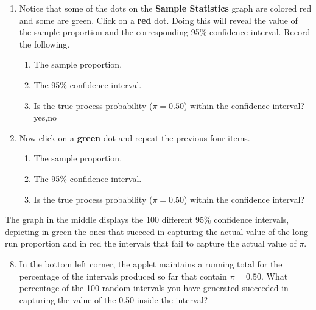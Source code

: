 \documentclass{amsart}
\begin{document}
\begin{Form}
\begin{enumerate}
\item Notice that some of the dots on the \textbf{Sample Statistics} graph are colored red and some are green. Click on a {\bf red} dot. Doing this will reveal the value of the sample proportion and the corresponding 95\% confidence interval. Record the following.
\begin{enumerate}
\item The sample proportion.  \TextField[name=q5b,width=30pt]{}
\item The 95\% confidence interval. \TextField[name=q5c,width=75pt]{}
\item Is the true process probability  ($\pi=0.50$) within the confidence interval?
\ChoiceMenu[combo,name=q5e,width=1.5cm,charsize=14pt]{\mbox{}}
{yes,no} \\
\end{enumerate}

\item Now click on a {\bf green} dot and repeat the previous four items.
\begin{enumerate}
\item The sample proportion.  \TextField[name=q5f,width=30pt]{}
\item The 95\% confidence interval. \TextField[name=q5g,width=75pt]{}
\item Is the true process probability ($\pi=0.50$) within the confidence interval?
\end{enumerate}
\end{enumerate}
\bigskip

\noindent The graph in the middle displays the 100 different 95\% confidence intervals, depicting in green the ones that succeed in capturing the actual value of the long-run proportion and in red the intervals that fail to capture the actual value of $\pi$.
\bigskip

\begin{enumerate}
\setcounter{enumi}{7}
\item In the bottom left corner, the applet maintains a running total for the percentage of the intervals produced so far that contain $\pi=0.50$. What percentage of the 100 random intervals you have generated succeeded in capturing the value of the 0.50 inside the interval? \TextField[name=q5j,width=30pt]{}
\bigskip


\end{enumerate}
\end{Form}
\end{document}
